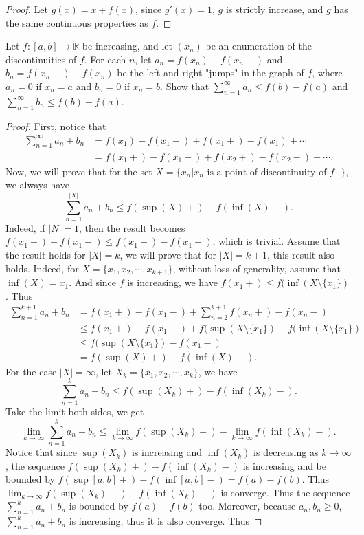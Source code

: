\documentclass[12pt, a4paper]{article}
\theoremstyle{plain}
\newcommand{\R}{\mathbb{R}}
\begin{document}
\begin{exercise}{34}
\begin{enumerate}[label=(\roman*)]
\begin{proof}
		Let $g(x)=x+f(x)$, since $g'(x)=1$, $g$ is strictly increase, and $g$ has the same continuous properties as $f$.
		\end{proof}
	\end{enumerate} 
\end{exercise}

\begin{exercise}{35}
Let $f:[a,b]\rightarrow\R$ be increasing, and let $(x_n)$ be an enumeration of the discontinuities of $f$. For each $n$, let $a_n=f(x_n)-f(x_n-)$ and $b_n=f(x_n+)-f(x_n)$ be the left and right "jumps" in the graph of $f$, where $a_n=0$ if $x_n=a$ and $b_n=0$ if $x_n=b$. Show that $\sum_{n=1}^\infty a_n\leq f(b)-f(a)$ and $\sum_{n=1}^{\infty}b_n\leq f(b)-f(a)$. 
\end{exercise}
	\begin{proof}
	First, notice that
	\begin{align*}
	\sum_{n=1}^{\infty}{a_n+b_n}&=f(x_1)-f(x_1-)+f(x_1+)-f(x_1)+\cdots\\
	&=f(x_1+)-f(x_1-)+f(x_2+)-f(x_2-)+\cdots.
	\end{align*}
	Now, we will prove that for the set $X=\{x_n|x_n \text{ is a point of discontinuity of $f$ }\}$, we always have 
	\[
	\sum_{n=1}^{|X|}{a_n+b_n}\leq f(\sup(X)+)-f(\inf(X)-).
	\]
	Indeed, if $|N|=1$, then the result becomes $f(x_1+)-f(x_1-)\leq f(x_1+)-f(x_1-)$, which is trivial. Assume that the result holds for $|X|=k$, we will prove that for $|X|=k+1$, this result also holds. Indeed, for $X=\{x_1,x_2,\cdots ,x_{k+1}\}$, without loss of generality, assume that $\inf(X)=x_1$. And since $f$ is increasing, we have $f(x_1+)\leq f(\inf(X\setminus\{x_1\})$. Thus
	\begin{align*}
	\sum_{n=1}^{k+1}{a_n+b_n}&=f(x_1+)-f(x_1-)+\sum_{n=2}^{k+1}{f(x_n+)-f(x_n-)}\\
	&\leq f(x_1+)-f(x_1-)+f(\sup(X\setminus\{x_1\})-f(\inf(X\setminus\{x_1\})\\
	&\leq f(\sup(X\setminus\{x_1\})-f(x_1-)\\
	&= f(\sup(X)+)-f(\inf(X)-).
	\end{align*}
	For the case $|X|=\infty$, let $X_k=\{x_1,x_2,\cdots ,x_k\}$, we have
	\[
	\sum_{n=1}^{k}{a_n+b_n}\leq f(\sup(X_k)+)-f(\inf(X_k)-).
	\]
	Take the limit both sides, we get
	\[
	\lim_{k\rightarrow\infty}\sum_{n=1}^{k}{a_n+b_n}\leq \lim_{k\rightarrow\infty} f(\sup(X_k)+)-\lim_{k\rightarrow\infty}f(\inf(X_k)-).
	\]
	Notice that since $\sup(X_k)$ is increasing and $\inf(X_k)$ is decreasing as $k\rightarrow\infty$, the sequence $f(\sup(X_k)+)-f(\inf(X_k)-)$ is increasing and be bounded by $f(\sup[a,b]+)-f(\inf[a,b]-)=f(a)-f(b)$. Thus $\lim_{k\rightarrow\infty} f(\sup(X_k)+)-f(\inf(X_k)-)$ is converge. Thus the sequence $\sum_{n=1}^{k}{a_n+b_n}$ is bounded by $f(a)-f(b)$ too. Moreover, because $a_n,b_n\geq 0$, $\sum_{n=1}^{k}{a_n+b_n}$ is increasing, thus it is also converge. Thus

\end{proof}
\end{document}
